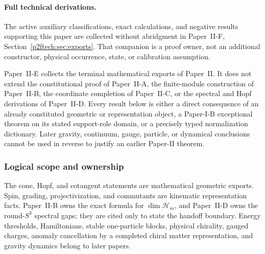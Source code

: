 \documentclass[12pt,a4paper]{article}
\begin{document}
\paragraph{Full technical derivations.}
The active auxiliary classifications, exact calculations, and negative
results supporting this paper are collected without abridgment in
Paper~II-F, Section~\ref{p2ftech:sec:exports}.
That companion is a proof owner, not an additional constructor,
physical occurrence, state, or calibration assumption.


Paper~II-E collects the terminal mathematical exports of Paper~II.  It does
not extend the constitutional proof of Paper~II-A, the finite-module
construction of Paper~II-B, the coordinate completion of Paper~II-C, or the
spectral and Hopf derivations of Paper~II-D.  Every result below is either a
direct consequence of an already constituted geometric or representation
object, a Paper-I-B exceptional theorem on its stated support-role domain, or
a precisely typed normalization dictionary.  Later gravity, continuum,
gauge, particle, or dynamical conclusions cannot be used in reverse to justify
an earlier Paper-II theorem.

\subsubsection{Logical scope and ownership}

The cone, Hopf, and cotangent statements are mathematical geometric exports.
Spin, grading, projectivization, and commutants are kinematic representation
facts.  Paper~II-B owns the exact formula for
\(\dim\mathcal H_m\), and Paper~II-D owns the round-\(S^3\) spectral gaps;
they are cited only to state the handoff boundary.  Energy thresholds,
Hamiltonians, stable one-particle blocks, physical chirality, gauged charges,
anomaly cancellation by a completed chiral matter representation, and
gravity dynamics belong to later papers.
\end{document}
